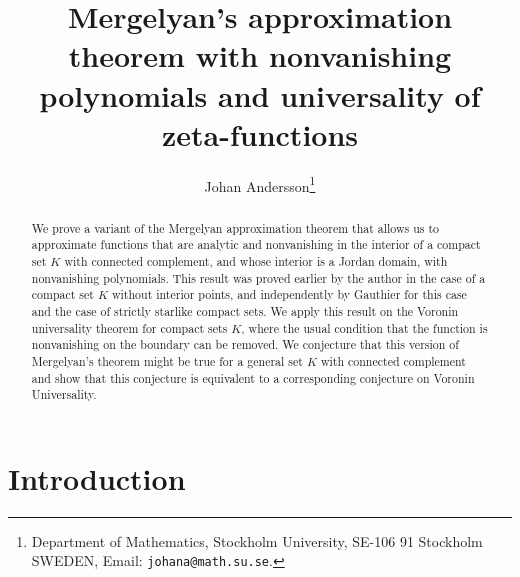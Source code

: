 \documentclass[11pt]{article}
\begin{document}
\title{Mergelyan's approximation theorem with nonvanishing polynomials and universality of zeta-functions}

\theoremstyle{plain}
\newtheorem{thm}{Theorem}
\newtheorem{lem}{Lemma}\renewcommand{\thelem}{\hskip -4 pt}
\newtheorem{cor}{Corollary}
\theoremstyle{definition} 
\newtheorem{example}{Example}
\newtheorem{prob}{Problem}\newtheorem{conj}{Conjecture}
\newtheorem{defn}{Definition}
\newtheorem{rem}{Remark}
\newtheorem{ack}{Acknowledgements}
\renewcommand{\theack}{\hskip -4 pt}
\def\cprime{$'$}
\newcommand{\C}{{\mathbb C}} 
\newcommand{\R}{{\mathbb R}} \newcommand{\N}{{\mathbb N}}
\newcommand{\Z}{{\mathbb Z}}
\newcommand{\abs}[1]{{\left| {#1} \right|}} \newcommand{\p}[1]{{\left(
      {#1} \right)}} \newcommand{\jtf}[1]{{#1}^{\diamond}}

\newcommand{\Oh}[1]{{O \p{#1}}}

\renewcommand{\Re}{\operatorname{Re}} \renewcommand{\Im}{\operatorname{Im}} 





\author{Johan Andersson\thanks{Department of Mathematics, Stockholm University, 
SE-106 91 Stockholm SWEDEN, Email: {\texttt {johana@math.su.se}}.}}

\date{}
\maketitle

\begin{abstract}We prove a variant of the Mergelyan approximation theorem that allows us to approximate functions that are analytic and nonvanishing in the interior of a compact set $K$ with connected complement, and whose interior is a Jordan domain, with nonvanishing polynomials. This result was proved earlier by the author in the case of a compact set $K$ without interior points, and independently by Gauthier for this case and the case of strictly starlike compact sets. We apply this result on the Voronin universality theorem for compact sets $K$, where the usual condition that the function is nonvanishing on the boundary can be removed. We conjecture that this version of Mergelyan's theorem might be true for a general set $K$ with connected complement and show that this conjecture is equivalent to a corresponding conjecture on  Voronin Universality. 
\end{abstract}




\section{Introduction}
\end{document}
